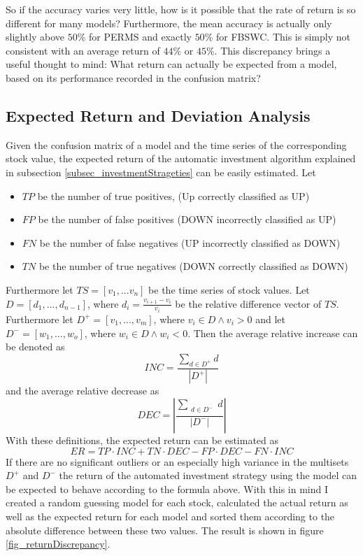  So if the accuracy varies very little, how is it possible that the rate of return is so different for many models? Furthermore, the mean accuracy is actually only slightly above $50\%$ for PERMS and exactly $50\%$ for FBSWC. This is simply not consistent with an average return of $44\%$ or $45\%$. This discrepancy brings a useful thought to mind: What return can actually be expected from a model, based on its performance recorded in the confusion matrix? \\

\subsection{Expected Return and Deviation Analysis}
Given the confusion matrix of a model and the time series of the corresponding stock value, the expected return of the automatic investment algorithm explained in subsection \ref{subsec_investmentStrageties} can be easily estimated. Let
\begin{itemize}
	\item $TP$ be the number of true positives, (Up correctly classified as UP)
	\item $FP$ be the number of false positives (DOWN incorrectly classified as UP)
	\item $FN$ be the number of false negatives (UP incorrectly classified as DOWN)
	\item $TN$ be the number of true negatives (DOWN correctly classified as DOWN)
\end{itemize}
Furthermore let $TS = [v_1,...v_n]$ be the time series of stock values. Let $D = [d_1,...,d_{n-1}]$, where $d_i = \frac{v_{i+1} - v_i}{v_i}$ be the relative difference vector of $TS$. Furthermore let $D^+ = [v_1,...,v_m]$, where $v_i \in D \land v_i > 0$ and let $D^- = [w_1,...,w_o]$, where $w_i \in D \land w_i < 0$.  Then the average relative increase can be denoted as \[INC  = \frac{\sum_{d \in D^+} d}{|D^+|} \] and the average relative decrease as \[ DEC = |\frac{\sum_{\substack{d \in D^-}} d}{|D^-|}| \]
With these definitions, the expected return can be estimated as \[ER  = TP \cdot INC + TN \cdot DEC - FP \cdot DEC - FN \cdot INC \]
If there are no significant outliers or an especially high variance in the multisets $D^+$ and $D^-$ the return of the automated investment strategy using the model can be expected to behave according to the formula above. With this in mind I created a random guessing model for each stock, calculated the actual return as well as the expected return for each model and sorted them according to the absolute difference between these two values. The result is shown in figure \ref{fig_returnDiscrepancy}.

